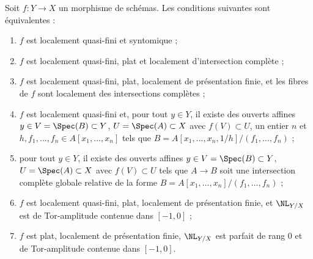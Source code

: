 \begin{lemma}
\label{lemma-syntomic-quasi-finite}
Soit $f : Y \to X$ un morphisme de schémas. Les conditions suivantes sont équivalentes :
\begin{enumerate}
\item $f$ est localement quasi-fini et syntomique ;
\item $f$ est localement quasi-fini, plat et localement d'intersection
complète ;
\item $f$ est localement quasi-fini, plat, localement de présentation finie,
et les fibres de $f$ sont localement des intersections complètes ;
\item $f$ est localement quasi-fini et, pour tout $y \in Y$, il existe des
ouverts affines $y \in V = \Spec(B) \subset Y$, $U = \Spec(A) \subset X$
avec $f(V) \subset U$, un entier $n$ et
$h, f_1, \ldots, f_n \in A[x_1, \ldots, x_n]$ tels que
$B = A[x_1, \ldots, x_n, 1/h]/(f_1, \ldots, f_n)$ ;
\item pour tout $y \in Y$, il existe des ouverts affines
$y \in V = \Spec(B) \subset Y$, $U = \Spec(A) \subset X$
avec $f(V) \subset U$ tels que $A \to B$ soit une intersection complète globale
relative de la forme $B = A[x_1, \ldots, x_n]/(f_1, \ldots, f_n)$ ;
\item $f$ est localement quasi-fini, plat, localement de présentation finie,
et $\NL_{Y/X}$ est de Tor-amplitude contenue dans $[-1, 0]$ ;
\item $f$ est plat, localement de présentation finie,
$\NL_{Y/X}$ est parfait de rang $0$ et de Tor-amplitude contenue dans $[-1, 0]$.
\end{enumerate}
\end{lemma}

